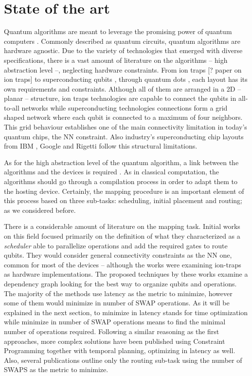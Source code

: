 \section*{State of the art}
\label{sec:org2d8452e}
Quantum algorithms are meant to leverage the promising power of quantum computers \cite{coles18:quant_algor_implem_begin}.
Commonly described as quantum circuits, quantum algorithms are hardware agnostic.
Due to the variety of technologies that emerged with diverse specifications, there is a vast amount of literature on the algorithms -- high abstraction level --, neglecting hardware constraints.
From ion traps [? paper on ion traps] to superconducting qubits \cite{Barends_2014,Versluis_2017}, through quantum dots \cite{Hill_2015,Li_2018}, each layout has its own requirements and constraints.
Although all of them are arranged in a 2D -- planar -- structure, ion traps technologies are capable to connect the qubits in all-to-all networks while superconducting technologies connections form a grid shaped network where each qubit is connected to a maximum of four neighbors.
This grid behaviour establishes one of the main connectivity limitation in today's quantum chips, the NN constraint.
Also industry's superconducting chip layouts from IBM \cite{IBM_QX}, Google \cite{boixo16:charac_quant_suprem_near_term_devic} and Rigetti \cite{Sete_2016} follow this structural limitations.

As for the high abstraction level of the quantum algorithm, a link between the algorithms and the devices is required \cite{Fu_2016}.
As in classical computation, the algorithms should go through a compilation process in order to adapt them to the hosting device.
Certainly, the mapping procedure is an important element of this process based on three sub-tasks: scheduling, initial placement and routing; as we considered before.

There is a considerable amount of literature on the mapping task.
Initial works on this field \cite{Metodi_2006,Whitney_2007,Bahreini_2015} focused primarily on the definition of what they characterized as a \emph{scheduler} able to parallelize operations and add the required gates to route qubits.
They would consider general connectivity constraints as the NN one, common for most of the devices -- although the works were examining ion-traps as hardware implementations.
The proposed techniques by these works examine a dependency graph looking for the best way to organize qubits and operations.
The majority of the methods use latency as the metric to minimize, however some of them \cite{Farghadan_2017} would minimize in number of SWAP operations.
As it will be explained in the next section, to minimize in latency stands for time optimization while minimize in number of SWAP operations means to find the minimal number of operations required.
Following a similar reasoning as the first approaches, more complex solutions \cite{booth18:compar_integ_const_progr_tempor} have been published using Constraint Programming together with temporal planning, optimizing in latency as well.
Also, several publications \cite{Lye_2015,Wille_2016} outline only the routing sub-task using the number of SWAPS as the metric to minimize.

